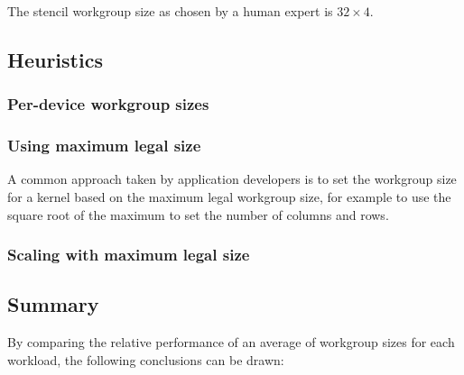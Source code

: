 The stencil workgroup size as chosen by a human expert is
$32 \times 4$.




\subsection{Heuristics}

\subsubsection{Per-device workgroup sizes}


\subsubsection{Using maximum legal size}

A common approach taken by application developers is to set the
workgroup size for a kernel based on the maximum legal workgroup size,
for example to use the square root of the maximum to set the number of
columns and rows.


\subsubsection{Scaling with maximum legal size}



\subsection{Summary}

By comparing the relative performance of an average of
 workgroup sizes for each workload, the
following conclusions can be drawn:


